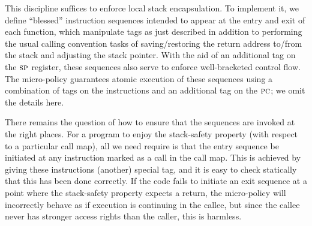 \documentclass[acmsmall,review,anonymous]{acmart}\settopmatter{printfolios=true,printccs=false,printacmref=false}
\newcommand*{\rsp}{\textsc{sp}}
\begin{document}
This discipline suffices to enforce local stack encapsulation.
To implement it,  we define ``blessed'' instruction sequences
intended to appear at the entry and exit of each function,
which manipulate tags as just described in addition to performing the
usual calling convention tasks of saving/restoring the return address to/from
the stack and adjusting the stack pointer. With the aid of an additional tag on
the $\rsp$ register, these sequences also serve to enforce
well-bracketed control flow.
The micro-policy guarantees atomic execution of these sequences
using a combination of tags on the instructions
and an additional tag on the $\textsc{pc}$; we omit the details here.

There remains the question of how to ensure that the sequences are
invoked at the right places. For a program to enjoy the stack-safety property
(with respect to a particular call map), all we need require is that
the entry sequence be initiated at any instruction marked as a call
in the call map. This is achieved by giving these instructions (another) special tag,
and it is easy to check statically that this has been done correctly.
If the code fails to initiate an exit
sequence at a point where the stack-safety property expects a return,
the micro-policy will incorrectly behave as if execution
is continuing in the callee, but since the callee never has stronger access
rights than the caller, this is harmless.

\end{document}
